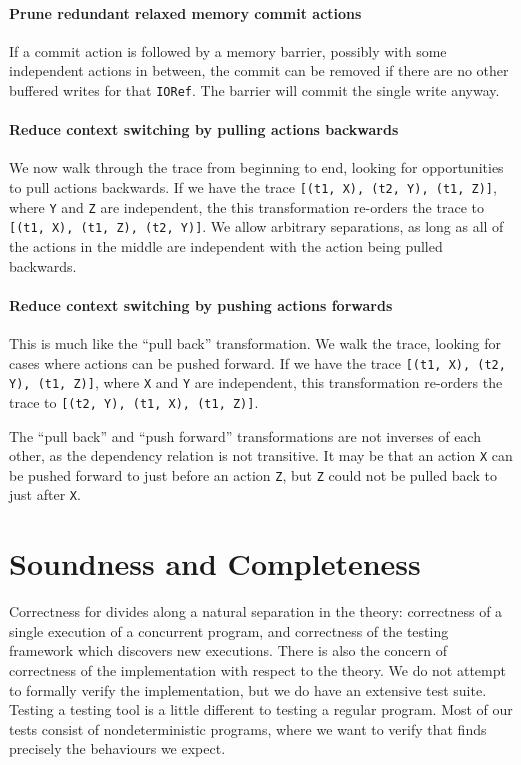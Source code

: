 \paragraph{Prune redundant relaxed memory commit actions}
If a commit action is followed by a memory barrier, possibly with some
independent actions in between, the commit can be removed if there are
no other buffered writes for that \verb|IORef|.  The barrier will
commit the single write anyway.

\paragraph{Reduce context switching by pulling actions backwards}
We now walk through the trace from beginning to end, looking for
opportunities to pull actions backwards.  If we have the trace
\verb|[(t1, X), (t2, Y), (t1, Z)]|, where \verb|Y| and \verb|Z| are
independent, the this transformation re-orders the trace to
\verb|[(t1, X), (t1, Z), (t2, Y)]|.  We allow arbitrary separations,
as long as all of the actions in the middle are independent with the
action being pulled backwards.

\paragraph{Reduce context switching by pushing actions forwards}
This is much like the ``pull back'' transformation.  We walk the
trace, looking for cases where actions can be pushed forward.  If we
have the trace \verb|[(t1, X), (t2, Y), (t1, Z)]|, where \verb|X| and
\verb|Y| are independent, this transformation re-orders the trace to
\verb|[(t2, Y), (t1, X), (t1, Z)]|.

The ``pull back'' and ``push forward'' transformations are not
inverses of each other, as the dependency relation is not transitive.
It may be that an action \verb|X| can be pushed forward to just before
an action \verb|Z|, but \verb|Z| could not be pulled back to just
after \verb|X|.

\section{Soundness and Completeness}
\label{sec:dejafu-correctness}

Correctness for \dejafu{} divides along a natural separation in the
theory: correctness of a single execution of a concurrent program, and
correctness of the testing framework which discovers new executions.
There is also the concern of correctness of the implementation with
respect to the theory.  We do not attempt to formally verify the
implementation, but we do have an extensive test suite.  Testing a
testing tool is a little different to testing a regular program.  Most
of our tests consist of nondeterministic programs, where we want to
verify that \dejafu{} finds precisely the behaviours we expect.

